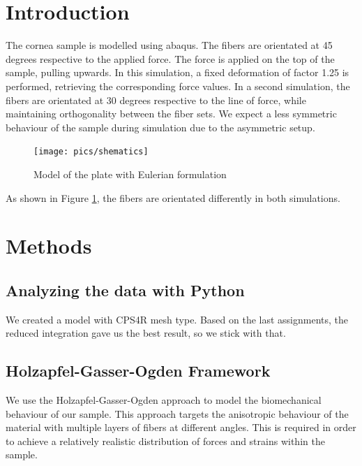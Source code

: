 \documentclass[12pt]{article}
\begin{document}
\tableofcontents
\pagebreak
\section{Introduction}

The cornea sample is modelled using abaqus. The fibers are orientated at 45 degrees respective to
the applied force. The force is applied on the top of the sample, pulling upwards.
In this simulation, a fixed deformation of factor 1.25 is performed, retrieving the corresponding 
force values.
In a second simulation, the fibers are orientated  at 30 degrees respective to the line of force,
while maintaining orthogonality between the fiber sets. We expect a less symmetric behaviour of the sample
during simulation due to the asymmetric setup.

\begin{figure}[!htb]
  \centering
  \texttt{[image: pics/shematics]}
  \caption{Model of the plate with Eulerian formulation}
  \label{fig:1}
\end{figure}

\noindent As shown in Figure \ref{fig:1}, the fibers are orientated differently in both simulations.

\newpage
\section{Methods}

\subsection{Analyzing the data with Python}

We created a model with CPS4R mesh type. Based on the last assignments, the reduced integration
gave us the best result, so we stick with that.

\subsection{Holzapfel-Gasser-Ogden Framework}

We use the Holzapfel-Gasser-Ogden approach to model the biomechanical behaviour of our
sample. This approach targets the anisotropic behaviour of the material with multiple
layers of fibers at different angles. This is required in order to achieve a relatively
realistic distribution of forces and strains within the sample.




\pagebreak
\end{document}
